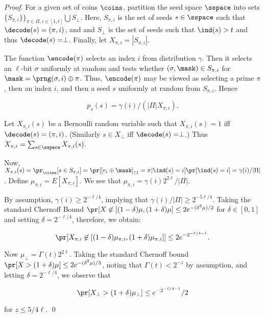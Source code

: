 \begin{proof}
For a given set of coins $\coins$, partition the seed space $\sspace$ into sets $\{S_{\pi,i}\}\}_{\pi \in \Pi, i \in [1,t]} \bigcup S_{\perp}$. Here, $S_{\pi,i}$ is  the set of seeds $s \in \sspace$ such that $\decode(s) = (\pi,i)$, and and $S_{\perp}$ is the set of seeds such that $\ind(s) > t$ and thus $\decode(s) = \perp$. Finally, let $X_{\pi,i} = |S_{\pi,i}|$.

The function $\encode(\pi)$ selects an index $i$ from distribution $\gamma$. Then it selects an $\ell$-bit $\sigma$ uniformly at random and tests whether $(\sigma, \mask) \in S_{\pi, i}$ for $\mask = \prng(\sigma, i) \oplus \pi$. Thus, $\encode(\pi)$ may be viewed as selecting a prime $\pi$, then an index $i$, and then a seed $s$ uniformly at random from $S_{\pi,i}$. Hence

\begin{equation}
\label{eq:seed_prob}
p_s(s) = \gamma(i) / (|\Pi| X_{\pi,i}). 
\end{equation}

Let $X_{\pi,i}(s)$ be a Bernoulli random variable such that $X_{\pi,i}(s) = 1$ iff $\decode(s) = (\pi,i)$. (Similarly $s \in X_{\perp}$ iff $\decode(s) = \perp$.) Thus $X_{\pi,i} = \sum_{s \in \sspace} X_{\pi,i}(s)$. 

Now, $X_{\pi,i}(s) = \pr_{\coins}[s \in S_{\pi,i}] = \pr[[r_i \oplus \mask]_{\uparrow 1} = \pi | \ind(s) = i] \pr[\ind(s) = i] = \gamma(i) / |\Pi|$. Define $\mu_{\pi,i} = E[X_{\pi,i}]$. We see that $\mu_{\pi,i} = \gamma(i)2^{2\ell} / |\Pi|$.

By assumption, $\gamma(i) \geq 2^{-\ell / 4}$, implying that $\gamma(i) / |\Pi| \geq 2^{-5\ell / 4}$.
Taking the standard Chernoff Bound $\pr[X \not \in [(1 - \delta) \mu, (1 + \delta)\mu] \leq 2e^{-(\delta^2 \mu) / 2}$ for $\delta \in [0,1]$ and setting $\delta = 2^{-\ell / 4}$, therefore, we obtain:

\begin{equation}
\pr[X_{\pi,i} \not \in [(1 - \delta) \mu_{\pi,i}, (1 + \delta)\mu_{\pi,i}]] \leq 2e^{-2^{-\ell/4-1} }.
\end{equation}

Now $\mu_{\perp} = \Gamma(t)2^{2\ell}$. Taking the standard Chernoff bound $\pr[X > (1 + \delta)\mu] \leq 2e^{-(\delta^2 \mu) / 3}$, noting that $\Gamma(t) < 2^{-z}$ by assumption, and letting $\delta = 2^{-\ell / 4}$, we observe that

\begin{equation}
\pr[X_{\perp} > (1 + \delta)\mu_{\perp}] \leq e^{-2^{-\ell/4-1}}/2
\end{equation}

\noindent for $z \leq 5/4 \ell$. 
\qed

\end{proof}

